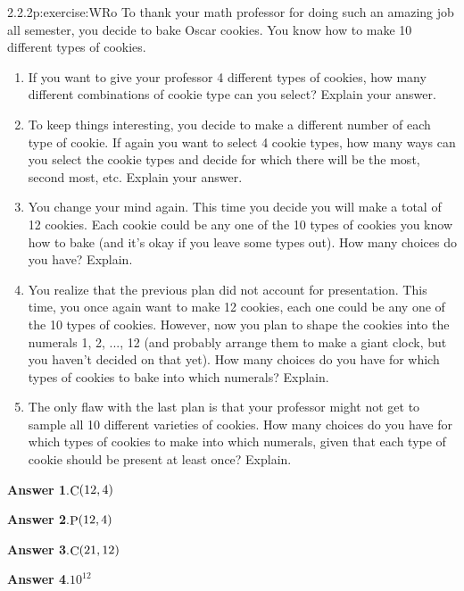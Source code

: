 \documentclass[twoside,11pt,]{book}
\newcommand{\blocktitlefont}{\relax}
\numberwithin{equation}{chapter}
\begin{document}
\begin{divisionsolution}{2.2.2}{}{p:exercise:WRo}%
To thank your math professor for doing such an amazing job all semester, you decide to bake Oscar cookies. You know how to make 10 different types of cookies.%
\begin{enumerate}[label=(\alph*)]
\item{}If you want to give your professor 4 different types of cookies, how many different combinations of cookie type can you select? Explain your answer.%
\item{}To keep things interesting, you decide to make a different number of each type of cookie. If again you want to select 4 cookie types, how many ways can you select the cookie types and decide for which there will be the most, second most, etc. Explain your answer.%
\item{}You change your mind again. This time you decide you will make a total of 12 cookies. Each cookie could be any one of the 10 types of cookies you know how to bake (and it's okay if you leave some types out). How many choices do you have? Explain.%
\item{}You realize that the previous plan did not account for presentation. This time, you once again want to make 12 cookies, each one could be any one of the 10 types of cookies. However, now you plan to shape the cookies into the numerals 1, 2, ..., 12 (and probably arrange them to make a giant clock, but you haven't decided on that yet). How many choices do you have for which types of cookies to bake into which numerals? Explain.%
\item{}The only flaw with the last plan is that your professor might not get to sample all 10 different varieties of cookies. How many choices do you have for which types of cookies to make into which numerals, given that each type of cookie should be present at least once? Explain.%
\end{enumerate}
%
\par\smallskip%
\noindent\textbf{\blocktitlefont Answer 1}.\quad{}\(\mathop{\rm C}\nolimits\!\left(12,4\right)\)%
\par\smallskip%
\noindent\textbf{\blocktitlefont Answer 2}.\quad{}\(\mathop{\rm P}\nolimits\!\left(12,4\right)\)%
\par\smallskip%
\noindent\textbf{\blocktitlefont Answer 3}.\quad{}\(\mathop{\rm C}\nolimits\!\left(21,12\right)\)%
\par\smallskip%
\noindent\textbf{\blocktitlefont Answer 4}.\quad{}\(10^{12}\)%
\par\smallskip%

\end{divisionsolution}
\end{document}
